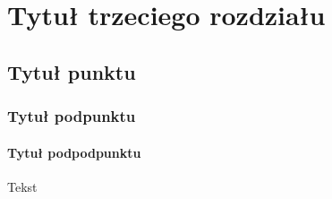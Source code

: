 ﻿%
\chapter{Tytuł trzeciego rozdziału}
\section{Tytuł punktu}
\subsection{Tytuł podpunktu}
\subsubsection{Tytuł podpodpunktu}
Tekst

